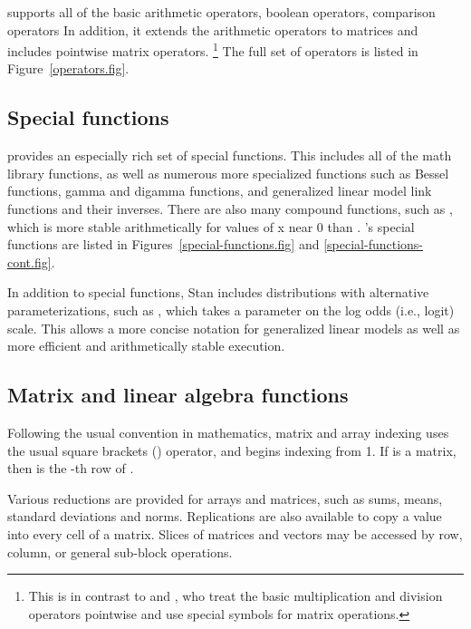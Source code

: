 \documentclass[article]{jss}
\begin{document}
 supports all of the basic  arithmetic
operators, boolean operators, comparison operators  In addition, it
extends the arithmetic operators to matrices and includes pointwise
matrix operators.%
%
\footnote{This is in contrast to  and , who
  treat the basic multiplication and division operators pointwise and
  use special symbols for matrix operations.}
%
The full set of operators is listed in Figure~\ref{operators.fig}.

\subsection{Special functions}

 provides an especially rich set of special functions.
This includes all of the  math library functions, as
well as numerous more specialized functions such as Bessel functions,
gamma and digamma functions, and generalized linear model link
functions and their inverses.  There are also many compound functions,
such as , which is more stable arithmetically for
values of x near 0 than .  's special
functions are listed in Figures~\ref{special-functions.fig} and
\ref{special-functions-cont.fig}.  

In addition to special functions, Stan includes distributions with
alternative parameterizations, such as , which
takes a parameter on the log odds (i.e., logit) scale.  This allows a
more concise notation for generalized linear models as well as more
efficient and arithmetically stable execution.  


\subsection{Matrix and linear algebra functions}

Following the usual convention in mathematics, matrix and array
indexing uses the usual square brackets (\code{[ ]}) operator, and
begins indexing from 1.  If  is a matrix, then
 is the -th row of .

Various reductions are provided for arrays and matrices, such as sums,
means, standard deviations and norms.  Replications are also available
to copy a value into every cell of a matrix.  Slices of matrices and
vectors may be accessed by row, column, or general sub-block
operations.
\end{document}
